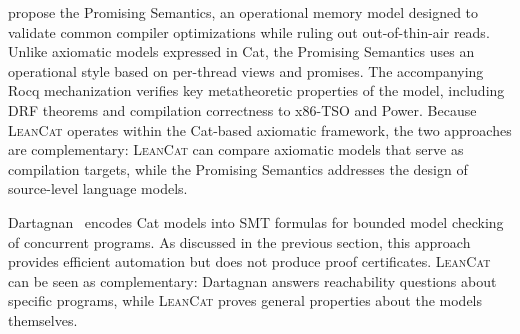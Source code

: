 \citet{kang2017promising} propose the Promising Semantics, an operational memory model designed to validate common compiler optimizations while ruling out out-of-thin-air reads. Unlike axiomatic models expressed in Cat, the Promising Semantics uses an operational style based on per-thread views and promises. The accompanying Rocq mechanization verifies key metatheoretic properties of the model, including DRF theorems and compilation correctness to x86-TSO and Power. Because \textsc{LeanCat} operates within the Cat-based axiomatic framework, the two approaches are complementary: \textsc{LeanCat} can compare axiomatic models that serve as compilation targets, while the Promising Semantics addresses the design of source-level language models.

Dartagnan~\citep{10.1145/3776687} encodes Cat models into SMT formulas for bounded model checking of concurrent programs. As discussed in the previous section, this approach provides efficient automation but does not produce proof certificates. \textsc{LeanCat} can be seen as complementary: Dartagnan answers reachability questions about specific programs, while \textsc{LeanCat} proves general properties about the models themselves.

